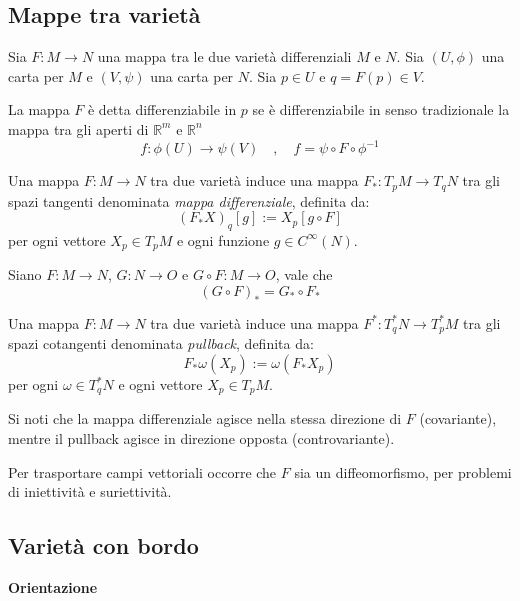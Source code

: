 \subsection{Mappe tra varietà}
Sia $F : M \to N$ una mappa tra le due varietà differenziali $M$ e $N$.
Sia $(U,\phi)$ una carta per $M$ e $(V,\psi)$ una carta per $N$. Sia $p \in U$ e
$q = F(p) \in V$.
\begin{definition}
   La mappa $F$ è detta differenziabile in $p$ se è differenziabile
   in senso tradizionale la mappa tra gli aperti di $\mathbb{R}^m$ e
   $\mathbb{R}^n$
   $$ f : \phi(U) \to \psi(V) \quad , \quad f = \psi \circ F \circ \phi^{-1} $$
\end{definition}

\begin{definition}
   Una mappa $F : M \to N$ tra due varietà induce una mappa
   $F_* : T_p M \to T_q N$ tra gli spazi tangenti denominata
   \emph{mappa differenziale}, definita da:
   $$ (F_*X)_q [g] := X_p [g \circ F] $$
   per ogni vettore $X_p \in T_p M$ e ogni funzione $g \in C^\infty(N)$.
\end{definition}

Siano $F : M \to N$, $G : N \to O$ e $G \circ F : M \to O$, vale che
   $$ (G \circ F)_* = G_* \circ F_* $$

\begin{definition}
   Una mappa $F : M \to N$ tra due varietà induce una mappa
   $F^* : T^*_q N \to T^*_p M$ tra gli spazi cotangenti denominata
   \emph{pullback}, definita da:
   $$ F_*\omega (X_p) := \omega (F_* X_p) $$
   per ogni $\omega \in T^*_q N$ e ogni vettore $X_p \in T_p M$.
\end{definition}

Si noti che la mappa differenziale agisce nella stessa direzione di $F$ (covariante),
mentre il pullback agisce in direzione opposta (controvariante).

Per trasportare campi vettoriali occorre che $F$ sia un diffeomorfismo, per problemi
di iniettività e suriettività.\\

\subsection{Varietà con bordo}
\textbf{Orientazione}\\
